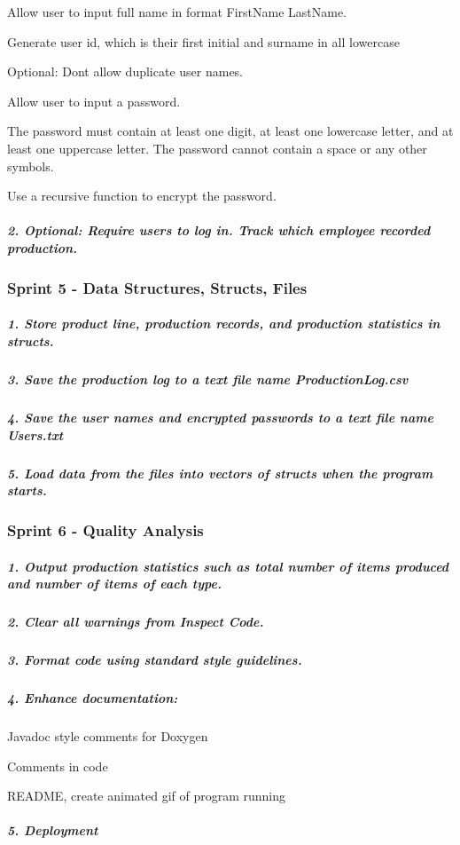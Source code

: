 \begin{DoxyEnumerate}
\item Allow user to input full name in format First\+Name Last\+Name.
\end{DoxyEnumerate}
\begin{DoxyItemize}
\item Generate user id, which is their first initial and surname in all lowercase
\item Optional\+: Don\textquotesingle{}t allow duplicate user names.
\end{DoxyItemize}
\begin{DoxyEnumerate}
\item Allow user to input a password.
\end{DoxyEnumerate}
\begin{DoxyItemize}
\item The password must contain at least one digit, at least one lowercase letter, and at least one uppercase letter. The password cannot contain a space or any other symbols.
\item Use a recursive function to encrypt the password. \subparagraph*{2. Optional\+: Require users to log in. Track which employee recorded production.}
\end{DoxyItemize}

\subsubsection*{Sprint 5 -\/ Data Structures, Structs, Files}

\subparagraph*{1. Store product line, production records, and production statistics in structs.}

\subparagraph*{3. Save the production log to a text file name Production\+Log.\+csv}

\subparagraph*{4. Save the user names and encrypted passwords to a text file name Users.\+txt}

\subparagraph*{5. Load data from the files into vectors of structs when the program starts.}

\subsubsection*{Sprint 6 -\/ Quality Analysis}

\subparagraph*{1. Output production statistics such as total number of items produced and number of items of each type.}

\subparagraph*{2. Clear all warnings from Inspect Code.}

\subparagraph*{3. Format code using standard style guidelines.}

\subparagraph*{4. Enhance documentation\+:}


\begin{DoxyItemize}
\item Javadoc style comments for Doxygen
\item Comments in code
\item R\+E\+A\+D\+ME, create animated gif of program running \subparagraph*{5. Deployment}
\end{DoxyItemize}
